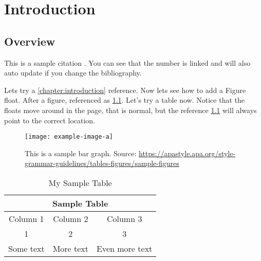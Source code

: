\chapter{Introduction\label{chapter:introduction}}

\lipsum

\section{Overview\label{sec:overview}}

\lipsum[1]

This is a sample citation \autocite{Bob2011}.
You can see that the number is linked and will also auto update if you change the bibliography.

Lets try a \cref{chapter:introduction} reference.
Now lets see how to add a Figure float.
After a figure, referenced as \cref{fig:samplefigure}.
Let's try a table now.
Notice that the floats move around in the page, that is normal, but the reference \cref{tab:sampletable} will always point to the correct location.

\begin{figure}
    \centering %
    \texttt{[image: example-image-a]} %
    \caption{This is a sample bar graph. Source: \url{https://apastyle.apa.org/style-grammar-guidelines/tables-figures/sample-figures}\label{fig:samplefigure}} %
\end{figure}


\begin{table} %
    \centering
    \caption{My Sample Table\label{tab:sampletable}}
    \begin{tabular}{c c c}
        \toprule
        \multicolumn{3}{c}{Sample Table} \\
        \midrule
        Column 1 & Column 2 & Column 3 \\
        \midrule
        1 & 2 & 3 \\  
        Some text & More text & Even more text \\
        \bottomrule
    \end{tabular}
\end{table}